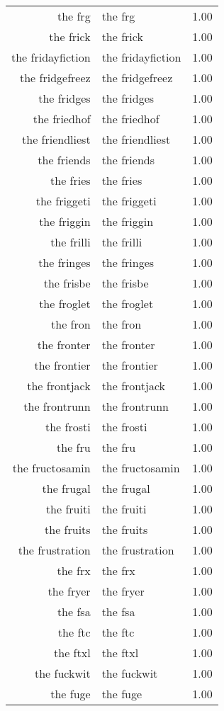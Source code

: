 \begin{table}[ht]
\begin{tabular}{rlr}
  the frg & the frg & 1.00 \\ 
  the frick & the frick & 1.00 \\ 
  the fridayfiction & the fridayfiction & 1.00 \\ 
  the fridgefreez & the fridgefreez & 1.00 \\ 
  the fridges & the fridges & 1.00 \\ 
  the friedhof & the friedhof & 1.00 \\ 
  the friendliest & the friendliest & 1.00 \\ 
  the friends & the friends & 1.00 \\ 
  the fries & the fries & 1.00 \\ 
  the friggeti & the friggeti & 1.00 \\ 
  the friggin & the friggin & 1.00 \\ 
  the frilli & the frilli & 1.00 \\ 
  the fringes & the fringes & 1.00 \\ 
  the frisbe & the frisbe & 1.00 \\ 
  the froglet & the froglet & 1.00 \\ 
  the fron & the fron & 1.00 \\ 
  the fronter & the fronter & 1.00 \\ 
  the frontier & the frontier & 1.00 \\ 
  the frontjack & the frontjack & 1.00 \\ 
  the frontrunn & the frontrunn & 1.00 \\ 
  the frosti & the frosti & 1.00 \\ 
  the fru & the fru & 1.00 \\ 
  the fructosamin & the fructosamin & 1.00 \\ 
  the frugal & the frugal & 1.00 \\ 
  the fruiti & the fruiti & 1.00 \\ 
  the fruits & the fruits & 1.00 \\ 
  the frustration & the frustration & 1.00 \\ 
  the frx & the frx & 1.00 \\ 
  the fryer & the fryer & 1.00 \\ 
  the fsa & the fsa & 1.00 \\ 
  the ftc & the ftc & 1.00 \\ 
  the ftxl & the ftxl & 1.00 \\ 
  the fuckwit & the fuckwit & 1.00 \\ 
  the fuge & the fuge & 1.00 \\ 

\end{tabular}
\end{table}
